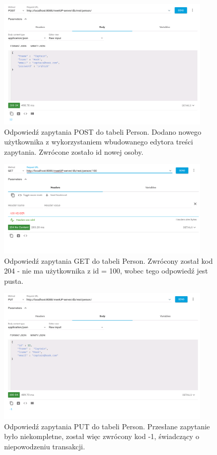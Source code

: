 \documentclass[12pt]{article}
\begin{document}
\begin{figure}[H]
\centering
\includegraphics[width=0.9\textwidth]{chrome3.png}
\caption{Odpowiedź zapytania POST do tabeli Person. Dodano nowego użytkownika z wykorzystaniem wbudowanego edytora treści zapytania. Zwrócone zostało id nowej osoby.}
\end{figure}

\begin{figure}[H]
\centering
\includegraphics[width=0.9\textwidth]{chrome1.png}
\caption{Odpowiedź zapytania GET do tabeli Person. Zwrócony został kod 204 - nie ma użytkownika z id = 100, wobec tego odpowiedź jest pusta.}
\end{figure}

\begin{figure}[H]
\centering
\includegraphics[width=0.9\textwidth]{chrome4.png}
\caption{Odpowiedź zapytania PUT do tabeli Person. Przesłane zapytanie było niekompletne, został więc zwrócony kod -1, świadczący o niepowodzeniu transakcji.}
\end{figure}
\end{document}
